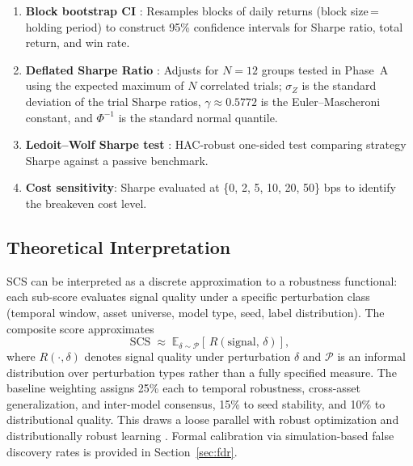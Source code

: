 \documentclass[12pt,a4paper]{article}
\begin{document}
\begin{enumerate}
  \item \textbf{Block bootstrap CI} \citep{politis1994stationary}: Resamples blocks of daily returns (block size\,=\,holding period) to construct 95\% confidence intervals for Sharpe ratio, total return, and win rate.
  \item \textbf{Deflated Sharpe Ratio} \citep{bailey2014deflated}: Adjusts for $N=12$ groups tested in Phase~A using the expected maximum of $N$ correlated trials; $\sigma_Z$ is the standard deviation of the trial Sharpe ratios, $\gamma \approx 0.5772$ is the Euler--Mascheroni constant, and $\Phi^{-1}$ is the standard normal quantile.
  \item \textbf{Ledoit--Wolf Sharpe test} \citep{ledoit2008robust}: HAC-robust one-sided test comparing strategy Sharpe against a passive benchmark.
  \item \textbf{Cost sensitivity}: Sharpe evaluated at \{0, 2, 5, 10, 20, 50\} bps to identify the breakeven cost level.
\end{enumerate}

\subsection{Theoretical Interpretation}
\label{sec:interpretation}

SCS can be interpreted as a discrete approximation to a robustness functional: each sub-score evaluates signal quality under a specific perturbation class (temporal window, asset universe, model type, seed, label distribution). The composite score approximates
\begin{equation}
  \text{SCS} \;\approx\; \mathbb{E}_{\delta \sim \mathcal{P}}\!\left[\,R\!\left(\text{signal},\, \delta\right)\right],
  \label{eq:robustness}
\end{equation}
where $R(\cdot, \delta)$ denotes signal quality under perturbation $\delta$ and $\mathcal{P}$ is an informal distribution over perturbation types rather than a fully specified measure. The baseline weighting assigns 25\% each to temporal robustness, cross-asset generalization, and inter-model consensus, 15\% to seed stability, and 10\% to distributional quality. This draws a loose parallel with robust optimization \citep{ben2009robust} and distributionally robust learning \citep{duchi2021learning}. Formal calibration via simulation-based false discovery rates is provided in Section~\ref{sec:fdr}.
\end{document}
